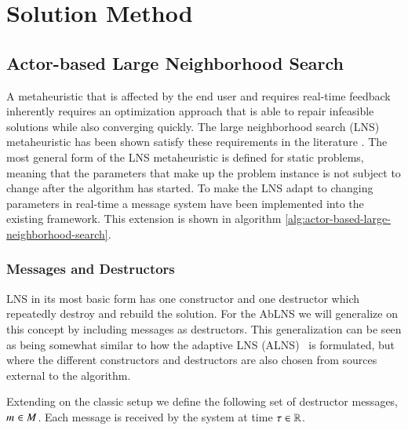 \section{Solution Method}
\label{sec:2-solution-method}

\subsection{Actor-based Large Neighborhood Search} 
A metaheuristic that is affected by the end user and requires real-time
feedback inherently requires an optimization approach that is able to repair
infeasible solutions while also converging quickly. The large neighborhood
search (LNS)~\citep{shaw1998using} metaheuristic has been shown satisfy these
requirements in the literature \citep{gendreauHandbookMetaheuristics2019}.
The most general form of the LNS metaheuristic is defined for static
problems, meaning that the parameters that make up the problem instance
is not subject to change after the algorithm has started. To make the
LNS adapt to changing parameters in real-time a message system have been
implemented into the existing framework. This  extension is shown in algorithm
\ref{alg:actor-based-large-neighborhood-search}.

\subsubsection{Messages and Destructors}
LNS in its most basic form has one constructor and one destructor which
repeatedly destroy and rebuild the solution. For the AbLNS we will
generalize on this concept by including messages as destructors. This
generalization can be seen as being somewhat similar to how the adaptive
LNS (ALNS)~\cite{pisinger2007general} is formulated, but where the different
constructors and destructors are also chosen from sources external to the
algorithm.

Extending on the classic setup we define the following set of 
destructor messages, $m_{}^{} \in M$. Each
message is received by the system at time $\tau \in \mathbb{R}$.

